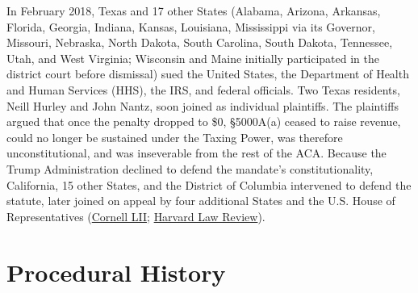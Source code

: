 \documentclass[12pt]{article}
\begin{document}
In February 2018, Texas and 17 other States (Alabama, Arizona, Arkansas, Florida, Georgia, Indiana, Kansas, Louisiana, Mississippi via its Governor, Missouri, Nebraska, North Dakota, South Carolina, South Dakota, Tennessee, Utah, and West Virginia; Wisconsin and Maine initially participated in the district court before dismissal) sued the United States, the Department of Health and Human Services (HHS), the IRS, and federal officials. Two Texas residents, Neill Hurley and John Nantz, soon joined as individual plaintiffs. The plaintiffs argued that once the penalty dropped to \$0, \S 5000A(a) ceased to raise revenue, could no longer be sustained under the Taxing Power, was therefore unconstitutional, and was inseverable from the rest of the ACA. Because the Trump Administration declined to defend the mandate's constitutionality, California, 15 other States, and the District of Columbia intervened to defend the statute, later joined on appeal by four additional States and the U.S. House of Representatives (\href{https://www.law.cornell.edu/supremecourt/text/19-840}{Cornell LII}; \href{https://harvardlawreview.org/print/vol-135/california-v-texas/}{Harvard Law Review}).

\section{Procedural History}
\end{document}
